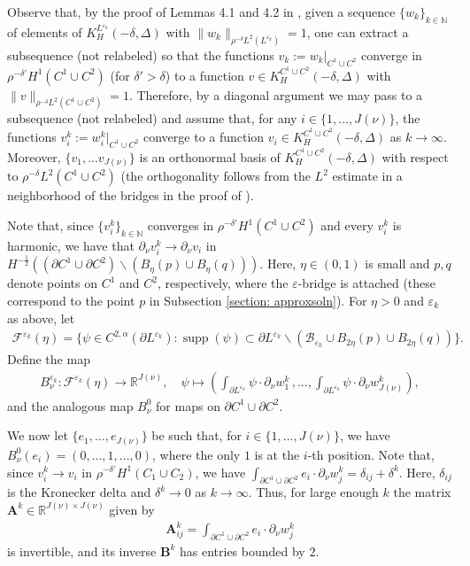 \documentclass[11pt]{amsart}
\theoremstyle{definition}
\theoremstyle{remark}
\begin{document}
Observe that, by the proof of Lemmas 4.1 and 4.2 in \cite{Sm93}, given a sequence $\{w_k\}_{k\in \mathbb{N}}$ of elements of $K_H^{L^{\varepsilon_k}}(-\delta,\Delta)$ with $\lVert w_k\rVert_{\rho^{-\delta} L^2(L^{\varepsilon_k})}=1$, one can extract a subsequence (not relabeled) so that the functions $v_k:=w_k\vert_{C^1\cup C^2}$ converge in $\rho^{-\delta'}H^1(C^1\cup C^2)$ (for $\delta'>\delta$) to a function $v\in K_H^{C^1\cup C^2}(-\delta,\Delta)$ with $\lVert v\rVert_{\rho^{-\delta} L^2(C^1\cup C^2)}=1$. Therefore, by a diagonal argument we may pass to a subsequence (not relabeled) and assume that, for any $i\in \{1,..., J(\nu)\}$, the functions $v_i^k:=w_i^k\vert_{C^1\cup C^2}$ converge to a function $v_i\in K_H^{C^1\cup C^2}(-\delta,\Delta)$ as $k \rightarrow \infty$. Moreover, $\{v_1,...v_{J(\nu)}\}$ is an orthonormal basis of $K_H^{C^1\cup C^2}(-\delta,\Delta)$ with respect to $\rho^{-\delta} L^2(C^1\cup C^2)$ (the orthogonality follows from the $L^2$ estimate in a neighborhood of the bridges in the proof of \cite[Lemma 4.1]{Sm93}).

Note that, since $\{v_i^k\}_{k\in \mathbb{N}}$ converges in $\rho^{-\delta'}H^1(C^1\cup C^2)$ and every $v_i^k$ is harmonic, we have that $\partial_\nu v_i^k\to \partial_\nu v_i$ in $H^{-\frac{1}{2}}((\partial C^1\cup \partial C^2)\smallsetminus (B_\eta(p)\cup B_\eta(q)))$. Here, $\eta\in (0,1)$ is small and $p,q$ denote points on $C^1$ and $C^2$, respectively, where the $\varepsilon$-bridge is attached (these correspond to the point $p$ in Subsection \ref{section: approxsoln}).
For $\eta>0$ and $\varepsilon_k$ as above, let
\begin{align*}
    \mathscr{F}^{\varepsilon_k}(\eta)=\{\psi\in C^{2,\alpha}(\partial L^{\varepsilon_k}): \operatorname{supp}(\psi)\subset\partial L^{\varepsilon_k}\smallsetminus(\mathscr{B}_{\varepsilon_k}\cup B_{2\eta}(p)\cup B_{2\eta}(q))\}.
\end{align*}
Define the map
\begin{align*}
    B_\nu^{\varepsilon_k}: \mathscr{F}^{\varepsilon_k}(\eta)\to \mathbb{R}^{J(\nu)},\quad \psi\mapsto \left(\int_{\partial L^{\varepsilon_k}}\psi\cdot\partial_{\nu}w_1^k\,,..., \int_{\partial L^{\varepsilon_k}}\psi\cdot\partial_{\nu}w_{J(\nu)}^k\right),
\end{align*}
and the analogous map $B_\nu^0$ for maps on $\partial C^1\cup \partial C^2$.

We now let $\{e_1,..., e_{J(\nu)}\}$ be such that, for $i\in \{1,..., J(\nu)\}$, we have $B_\nu^0(e_i)=(0,...,1,...,0)$, where the only $1$ is at the $i$-th position. Note that, since $v_i^k\to v_i$ in $\rho^{-\delta'}H^1(C_1\cup C_2)$, we have $\int_{\partial C^1\cup \partial C^2}e_i\cdot \partial_\nu w_j^k=\delta_{ij}+\delta^k$. Here, $\delta_{ij}$ is the Kronecker delta and $\delta^k\to 0$ as $k\to \infty$. Thus, for large enough $k$ the matrix $\textbf{A}^k\in \mathbb{R}^{J(\nu)\times J(\nu)}$ given by
\begin{align*}
    \mathbf{A}^k_{ij}=\int_{\partial C^1\cup \partial C^2}e_i\cdot \partial_\nu w_j^k
\end{align*}
is invertible, and its inverse $\mathbf{B}^k$ has entries bounded by $2$. 
\end{document}
